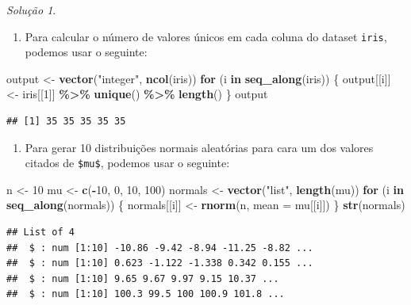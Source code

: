 \documentclass[
]{latex/krantz}
\newenvironment{Shaded}{\begin{snugshade}}{\end{snugshade}}
\newcommand{\AttributeTok}[1]{\textcolor[rgb]{0.13,0.29,0.53}{#1}}
\newcommand{\ControlFlowTok}[1]{\textcolor[rgb]{0.13,0.29,0.53}{\textbf{#1}}}
\newcommand{\DecValTok}[1]{\textcolor[rgb]{0.00,0.00,0.81}{#1}}
\newcommand{\FunctionTok}[1]{\textcolor[rgb]{0.13,0.29,0.53}{\textbf{#1}}}
\newcommand{\NormalTok}[1]{#1}
\newcommand{\OtherTok}[1]{\textcolor[rgb]{0.56,0.35,0.01}{#1}}
\newcommand{\SpecialCharTok}[1]{\textcolor[rgb]{0.81,0.36,0.00}{\textbf{#1}}}
\newcommand{\StringTok}[1]{\textcolor[rgb]{0.31,0.60,0.02}{#1}}
\providecommand{\tightlist}{%
  \setlength{\itemsep}{0pt}\setlength{\parskip}{0pt}}
\theoremstyle{definition}
\theoremstyle{definition}
\theoremstyle{definition}
\theoremstyle{definition}
\theoremstyle{remark}
\newtheorem*{solution}{Solução}
\begin{document}
\begin{solution}
\begin{enumerate}
\def\labelenumi{\alph{enumi}.}
\setcounter{enumi}{2}
\tightlist
\item
  Para calcular o número de valores únicos em cada coluna do dataset \texttt{iris}, podemos usar o seguinte:
\end{enumerate}

\begin{Shaded}
\begin{Highlighting}[]
\NormalTok{output }\OtherTok{\textless{}{-}} \FunctionTok{vector}\NormalTok{(}\StringTok{"integer"}\NormalTok{, }\FunctionTok{ncol}\NormalTok{(iris))}
\ControlFlowTok{for}\NormalTok{ (i }\ControlFlowTok{in} \FunctionTok{seq\_along}\NormalTok{(iris)) \{}
\NormalTok{  output[[i]] }\OtherTok{\textless{}{-}}\NormalTok{ iris[[}\DecValTok{1}\NormalTok{]] }\SpecialCharTok{\%\textgreater{}\%} 
                    \FunctionTok{unique}\NormalTok{() }\SpecialCharTok{\%\textgreater{}\%} 
                    \FunctionTok{length}\NormalTok{()}
\NormalTok{\}}
\NormalTok{output}
\end{Highlighting}
\end{Shaded}

\begin{verbatim}
## [1] 35 35 35 35 35
\end{verbatim}

\begin{enumerate}
\def\labelenumi{\alph{enumi}.}
\setcounter{enumi}{3}
\tightlist
\item
  Para gerar 10 distribuições normais aleatórias para cara um dos valores citados de \texttt{\$mu\$}, podemos usar o seguinte:
\end{enumerate}

\begin{Shaded}
\begin{Highlighting}[]
\NormalTok{n }\OtherTok{\textless{}{-}} \DecValTok{10}
\NormalTok{mu }\OtherTok{\textless{}{-}} \FunctionTok{c}\NormalTok{(}\SpecialCharTok{{-}}\DecValTok{10}\NormalTok{, }\DecValTok{0}\NormalTok{, }\DecValTok{10}\NormalTok{, }\DecValTok{100}\NormalTok{)}
\NormalTok{normals }\OtherTok{\textless{}{-}} \FunctionTok{vector}\NormalTok{(}\StringTok{"list"}\NormalTok{, }\FunctionTok{length}\NormalTok{(mu))}
\ControlFlowTok{for}\NormalTok{ (i }\ControlFlowTok{in} \FunctionTok{seq\_along}\NormalTok{(normals)) \{}
\NormalTok{  normals[[i]] }\OtherTok{\textless{}{-}} \FunctionTok{rnorm}\NormalTok{(n, }\AttributeTok{mean =}\NormalTok{ mu[[i]])}
\NormalTok{\}}
\FunctionTok{str}\NormalTok{(normals)}
\end{Highlighting}
\end{Shaded}

\begin{verbatim}
## List of 4
##  $ : num [1:10] -10.86 -9.42 -8.94 -11.25 -8.82 ...
##  $ : num [1:10] 0.623 -1.122 -1.338 0.342 0.155 ...
##  $ : num [1:10] 9.65 9.67 9.97 9.15 10.37 ...
##  $ : num [1:10] 100.3 99.5 100 100.9 101.8 ...
\end{verbatim}

\end{solution}
\end{document}

